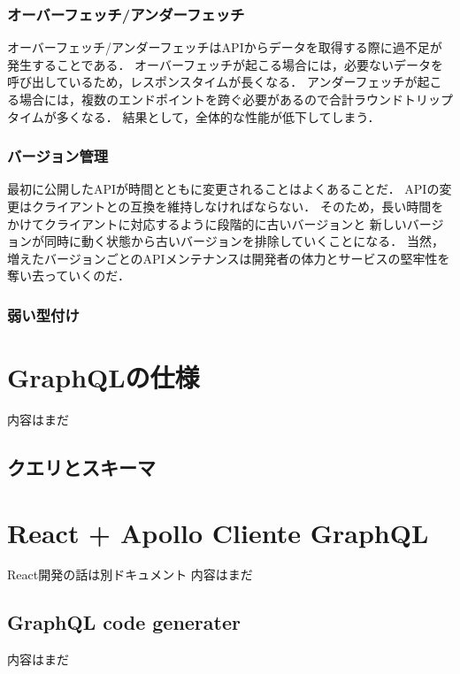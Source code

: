 \documentclass[11pt,a4paper]{jsarticle}
\begin{document}
\subsubsection{オーバーフェッチ/アンダーフェッチ}
オーバーフェッチ/アンダーフェッチはAPIからデータを取得する際に過不足が発生することである．
オーバーフェッチが起こる場合には，必要ないデータを呼び出しているため，レスポンスタイムが長くなる．
アンダーフェッチが起こる場合には，複数のエンドポイントを跨ぐ必要があるので合計ラウンドトリップタイムが多くなる．
結果として，全体的な性能が低下してしまう．
\subsubsection{バージョン管理}
最初に公開したAPIが時間とともに変更されることはよくあることだ．
APIの変更はクライアントとの互換を維持しなければならない．
そのため，長い時間をかけてクライアントに対応するように段階的に古いバージョンと
新しいバージョンが同時に動く状態から古いバージョンを排除していくことになる．
当然，増えたバージョンごとのAPIメンテナンスは開発者の体力とサービスの堅牢性を奪い去っていくのだ．

\subsubsection{弱い型付け}



\section{GraphQLの仕様}
内容はまだ
\subsection{クエリとスキーマ}

\section{React + Apollo Cliente GraphQL}
React開発の話は別ドキュメント
内容はまだ

\subsection{GraphQL code generater}
内容はまだ
\end{document}
